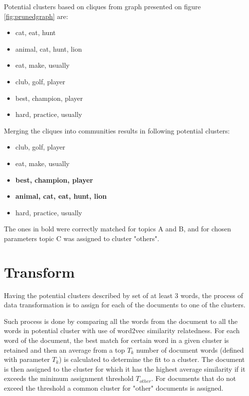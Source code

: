 \documentclass[a4paper, 12pt, oneside]{Thesis} %
\begin{document}
Potential clusters based on cliques from graph presented on figure \ref{fig:prunedgraph} are:
\begin{itemize}
    \item cat, eat, hunt
    \item animal, cat, hunt, lion
    \item eat, make, usually
    \item club, golf, player
    \item best, champion, player
    \item hard, practice, usually
\end{itemize}


Merging the cliques into communities results in following potential clusters:
\begin{itemize}
    \item club, golf, player
    \item eat, make, usually
    \item \textbf{best, champion, player}
    \item \textbf{animal, cat, eat, hunt, lion}
    \item hard, practice, usually    
\end{itemize}

The ones in bold were correctly matched for topics A and B, and for chosen parameters topic C was assigned to cluster "others".

\clearpage

\section{Transform} 

Having the potential clusters described by set of at least 3 words, the process of data transformation is to assign for each of the documents to one of the clusters.

Such process is done by comparing all the words from the document to all the words in potential cluster with use of word2vec similarity relatedness. For each word of the document, the best match for certain word in a given cluster is retained and then an average from a top $T_k$ number of document words (defined with parameter $T_k$) is calculated to determine the fit to a cluster. The document is then assigned to the cluster for which it has the highest average similarity if it exceeds the minimum assignment threshold $T_{other}$. For documents that do not exceed the threshold a common cluster for "other" documents is assigned.
\end{document}
